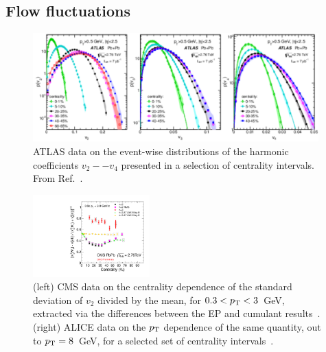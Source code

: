 \subsection{Flow fluctuations}
\begin{figure}[!tb]
\begin{center}
\includegraphics[width=0.98\textwidth]{flowcorrelations_figs/atlas_v2fluc_fig_10.pdf}
\caption[]{
ATLAS data on the event-wise distributions of the harmonic coefficients $v_2 -- v_4$ presented in a selection of
centrality intervals.  From Ref.~\cite{Aad:2013xma}.
}
\label{fig:pas:fc:flowfluc1}
\end{center}
\end{figure}

\begin{figure}[!tb]
\begin{center}
\includegraphics[width=0.40\textwidth]{flowcorrelations_figs/vnSigmaPrelim.pdf}
\caption[]{
(left) CMS data on the centrality dependence of the standard deviation of $v_2$
divided by the mean, for $0.3 < \mbox{$p_{\mathrm{T}}$} < 3$~GeV,
extracted via the differences between the EP and cumulant results~\cite{Chatrchyan:2013kba}.
(right) ALICE data on the $\mbox{$p_{\mathrm{T}}$}$ dependence of the same quantity, out to $\mbox{$p_{\mathrm{T}}$}=8$~GeV,
for a selected set of centrality
intervals~\cite{Abelev:2012di}.
}
\label{fig:pas:fc:flowfluc2}
\end{center}
\end{figure}

